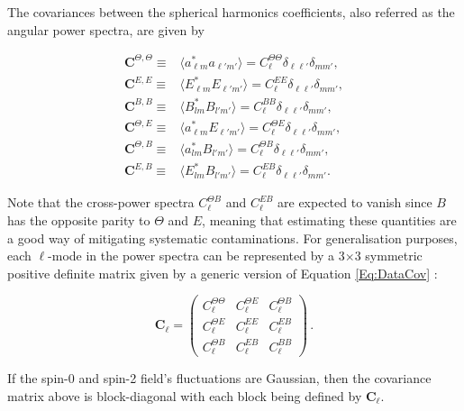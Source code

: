 \qquad The covariances between the spherical harmonics coefficients, also referred as the angular power spectra, are given by

\begin{align}
\label{eqn::chCmbPol_psTT}
\textbf{C}^{\Theta,\Theta}  \equiv & \langle a_{\ell m}^{*} a_{\ell'm'} \rangle  = C_{\ell}^{\Theta\Theta}\delta_{\ell\ell'}\delta_{mm'},\\
\label{eqn::chCmbPol_psEE}
\textbf{C}^{E,E} \equiv & \langle E_{\ell m}^{*} E_{\ell'm'} \rangle = C_{\ell}^{EE}\delta_{\ell\ell'}\delta_{mm'},\\
\label{eqn::chCmbPol_psBB}
\textbf{C}^{B,B} \equiv &\langle B_{lm}^{*} B_{l'm'} \rangle = C_{\ell}^{BB}\delta_{\ell\ell'}\delta_{mm'},\\
\label{eqn::chCmbPol_psTE}
\textbf{C}^{\Theta,E} \equiv & \langle a_{\ell m}^{*} E_{\ell'm'} \rangle = C_{\ell}^{\Theta E}\delta_{\ell\ell'}\delta_{mm'}, \\
\textbf{C}^{\Theta,B} \equiv &\langle a_{lm}^{*} B_{l'm'} \rangle = C_{\ell}^{\Theta B}\delta_{\ell\ell'}\delta_{mm'},\\
\textbf{C}^{E,B} \equiv &\langle E_{lm}^{*} B_{l'm'} \rangle = C_{\ell}^{EB}\delta_{\ell\ell'}\delta_{mm'}.
\end{align}

\qquad Note that the cross-power spectra $ C_{\ell}^{\Theta B}$ and $C_{\ell}^{EB}$ are expected to vanish since $B$ has the opposite parity to $\Theta$ and $E$, meaning that estimating these quantities are a good way of mitigating systematic contaminations. For generalisation purposes, each $\ell$-mode in the power spectra can be represented by a 3$\times$3 symmetric positive definite matrix given by a generic version of Equation \eqref{Eq:DataCov} :

\begin{equation}
\mathbf{C}_{\ell}=\left(
\begin{array}{ccc}
C_{\ell}^{\Theta\Theta} & C_{\ell}^{\Theta E} &  C_{\ell}^{\Theta B}\\
C_{\ell}^{\Theta E} & C_{\ell}^{EE} & C_{\ell}^{E B} \\
C_{\ell}^{\Theta B} & C_{\ell}^{E B} & C_{\ell}^{BB}
\end{array} \right)\, .
\label{Eq:Cl_blockDiag}
\end{equation}

\noindent If the spin-0 and spin-2 field's fluctuations are Gaussian, then the covariance matrix above is block-diagonal with each block being defined by $\mathbf{C}_{\ell}$. 

